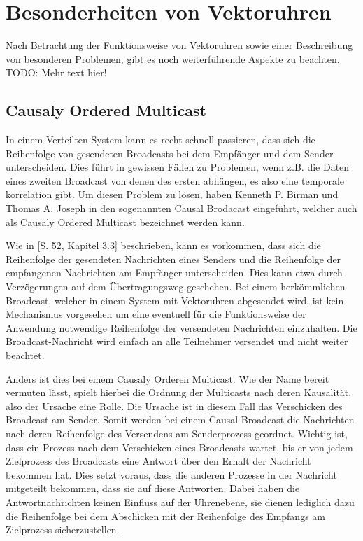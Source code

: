 \section{Besonderheiten von Vektoruhren}

Nach Betrachtung der Funktionsweise von Vektoruhren sowie einer Beschreibung von besonderen Problemen, gibt es noch weiterführende Aspekte zu beachten. 
TODO: Mehr text hier! 
\subsection{Causaly Ordered Multicast}

In einem Verteilten System kann es recht schnell passieren, dass sich die Reihenfolge von gesendeten Broadcasts bei dem Empfänger und dem Sender unterscheiden. Dies führt in gewissen Fällen zu Problemen, wenn z.B. die Daten eines zweiten Broadcast von denen des ersten abhängen, es also eine temporale korrelation gibt. Um diesen Problem zu lösen, haben Kenneth P. Birman und Thomas A. Joseph in \cite{Birman:1987:RCP:7351.7478} den sogenannten Causal Brodacast eingeführt, welcher auch als Causaly Ordered Multicast bezeichnet werden kann.

Wie in \cite{Birman:1987:RCP:7351.7478}[S. 52, Kapitel 3.3] beschrieben, kann es vorkommen, dass sich die Reihenfolge der gesendeten Nachrichten eines Senders und die Reihenfolge der empfangenen Nachrichten am Empfänger unterscheiden. Dies kann etwa durch Verzögerungen auf dem Übertragungsweg geschehen. Bei einem herkömmlichen Broadcast, welcher in einem System mit Vektoruhren abgesendet wird, ist kein Mechanismus vorgesehen um eine eventuell für die Funktionsweise der Anwendung notwendige Reihenfolge der versendeten Nachrichten einzuhalten. Die Broadcast-Nachricht wird einfach an alle Teilnehmer versendet und nicht weiter beachtet.

Anders ist dies bei einem Causaly Orderen Multicast. Wie der Name bereit vermuten lässt, spielt hierbei die Ordnung der Multicasts nach deren Kausalität, also der Ursache eine Rolle. Die Ursache ist in diesem Fall das Verschicken des Broadcast am Sender. Somit werden bei einem Causal Broadcast die Nachrichten nach deren Reihenfolge des Versendens am Senderprozess geordnet. Wichtig ist, dass ein Prozess nach dem Verschicken eines Broadcasts wartet, bis er von jedem Zielprozess des Broadcasts eine Antwort über den Erhalt der Nachricht bekommen hat. Dies setzt voraus, dass die anderen Prozesse in der Nachricht mitgeteilt bekommen, dass sie auf diese Antworten. Dabei haben die Antwortnachrichten keinen Einfluss auf der Uhrenebene, sie dienen lediglich dazu die Reihenfolge bei dem Abschicken mit der Reihenfolge des Empfangs am Zielprozess sicherzustellen.

